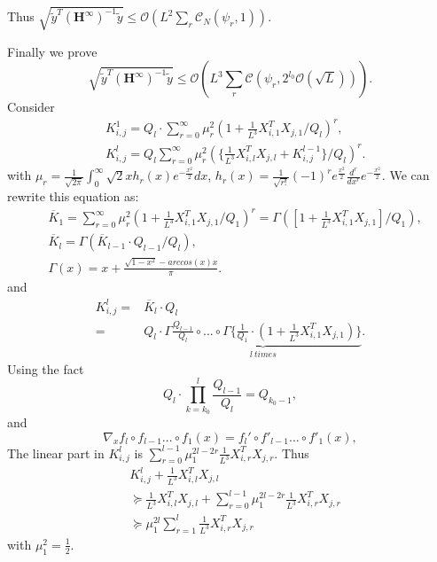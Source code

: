 \documentclass{article}
\newcommand{\cO}{\mathcal{O}}
\begin{document}
Thus $\sqrt{\widetilde{y}^T (\bm{H}^\infty)^{-1}\widetilde{y}}\leq \cO(L^2\sum_r\mathscr{C}_N(\psi_{r},1))$.


Finally we prove $$\sqrt{\widetilde{y}^T (\bm{H}^\infty)^{-1}\widetilde{y}}\leq \cO(L^3\sum_r\mathscr{C}(\psi_{r},2^{l_0}\cO(\sqrt{L}))).$$
Consider
\begin{equation}
\begin{aligned}
&K^1_{i,j}=Q_l\cdot \sum_{r=0}^\infty \mu^2_r (1+\frac{1}{L^3}X_{i,1}^TX_{j,1}/Q_l)^r,\\
&K^{l}_{i,j}=Q_l\sum_{r=0}^\infty \mu^2_r (\{\frac{1}{L^3}X_{i,l}^TX_{j,l}+ K^{l-1}_{i,j}\}/Q_l)^r.
\end{aligned}
\end{equation}
with  $\mu_r=\frac{1}{\sqrt{2\pi}}\int_0^\infty \sqrt{2}xh_r(x)e^{-\frac{x^2}{2}}dx$, $h_r(x)=\frac{1}{\sqrt{r!}}(-1)^re^{\frac{x^2}{2}}\frac{d^r}{dx^r}e^{-\frac{x^2}{2}}.$
We can rewrite this equation as:
\begin{equation}
\begin{aligned}
&\overline{K}_1=\sum_{r=0}^\infty \mu^2_r (1+\frac{1}{L^3}X_{i,1}^TX_{j,1}/Q_1)^r=\Gamma([1+\frac{1}{L^3}X_{i,1}^TX_{j,1}]/Q_1) ,\\
&\overline{K}_l=\Gamma(\overline K_{l-1}\cdot Q_{l-1}/Q_l),\\
&\Gamma(x)=x+\frac{\sqrt{1-x^2}-arccos(x)x}{\pi}.
\end{aligned}
\end{equation}
and
\begin{equation}\label{ev}
\begin{aligned}
K^{l}_{i,j}=&\overline{K}_l\cdot Q_l\\
=&Q_l\cdot \underbrace{\Gamma \frac{Q_{l-1}}{Q_{l}}\circ...\circ\Gamma \{ \frac{1}{Q_1}\cdot (1+\frac{1}{L^3}X_{i,1}^TX_{j,1})\}}_{l\ times}.
\end{aligned}
\end{equation}
Using the fact
\begin{equation}
Q_l \cdot \prod_{k=k_0}^{l}\frac{Q_{l-1}}{Q_l}=Q_{k_0-1},
\end{equation}
and $$\nabla_x f_l \circ f_{l-1}...\circ f_1(x)= f_l'\circ f'_{l-1}...\circ f'_1(x),$$
The linear part in $K^{l}_{i,j}$ is $\sum_{r=0}^{l-1} \mu_1^{2l-2r} \frac{1}{L^3}X_{i,r}^TX_{j,r}$. Thus
\begin{equation}
\begin{aligned}
&K^{l}_{i,j}+\frac{1}{L^3}X_{i,l}^TX_{j,l}\\
&\succeq \frac{1}{L^3}X_{i,l}^TX_{j,l}+ \sum_{r=0}^{l-1} \mu_1^{2l-2r} \frac{1}{L^3}X_{i,r}^TX_{j,r}\\
&\succeq \mu_1^{2l} \sum_{r=1}^l  \frac{1}{L^3}X_{i,r}^TX_{j,r}
\end{aligned}
\end{equation}
with $\mu_1^2=\frac{1}{2}$.
\end{document}
